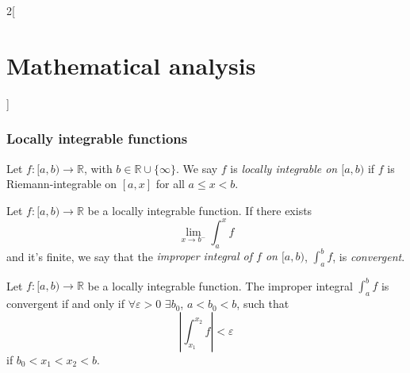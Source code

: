 \documentclass[class=article,crop=false]{standalone}
\begin{document}
\begin{multicols}{2}[\section{Mathematical analysis}]
\subsubsection*{Locally integrable functions}
\begin{definition}
Let $f:[a,b)\rightarrow\mathbb{R}$, with $b\in\mathbb{R}\cup\{\infty\}$. We say $f$ is \textit{locally integrable on $[a,b)$} if $f$ is Riemann-integrable on $[a,x]$ for all $a\leq x<b$.
\end{definition}
\begin{definition}
Let $f:[a,b)\rightarrow\mathbb{R}$ be a locally integrable function. If there exists $$\lim_{x\to b^-}\int_a^x f$$ and it's finite, we say that the \textit{improper integral of $f$ on $[a,b)$}, $\displaystyle\int_a^b f$, is \textit{convergent}.
\end{definition}
\begin{theorem}
Let $f:[a,b)\rightarrow\mathbb{R}$ be a locally integrable function. The improper integral $\displaystyle\int_a^b f$ is convergent if and only if $\forall\varepsilon>0$ $\exists b_0$, $a<b_0<b$, such that $$\left|\int_{x_1}^{x_2} f\right|<\varepsilon$$ if $b_0<x_1<x_2<b$.
\end{theorem}

\end{multicols}
\end{document}
